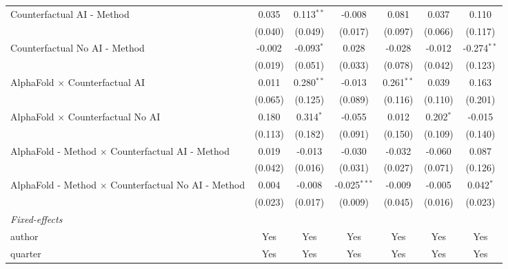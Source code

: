 \begin{tabular}{lcccccc}
   Counterfactual AI - Method                                 & 0.035   & 0.113$^{**}$ & -0.008         & 0.081        & 0.037        & 0.110\\   
                                                              & (0.040) & (0.049)      & (0.017)        & (0.097)      & (0.066)      & (0.117)\\   
   Counterfactual No AI - Method                              & -0.002  & -0.093$^{*}$ & 0.028          & -0.028       & -0.012       & -0.274$^{**}$\\   
                                                              & (0.019) & (0.051)      & (0.033)        & (0.078)      & (0.042)      & (0.123)\\   
   AlphaFold $\times$ Counterfactual AI                       & 0.011   & 0.280$^{**}$ & -0.013         & 0.261$^{**}$ & 0.039        & 0.163\\   
                                                              & (0.065) & (0.125)      & (0.089)        & (0.116)      & (0.110)      & (0.201)\\   
   AlphaFold $\times$ Counterfactual No AI                    & 0.180   & 0.314$^{*}$  & -0.055         & 0.012        & 0.202$^{*}$  & -0.015\\   
                                                              & (0.113) & (0.182)      & (0.091)        & (0.150)      & (0.109)      & (0.140)\\   
   AlphaFold - Method $\times$ Counterfactual AI - Method     & 0.019   & -0.013       & -0.030         & -0.032       & -0.060       & 0.087\\   
                                                              & (0.042) & (0.016)      & (0.031)        & (0.027)      & (0.071)      & (0.126)\\   
   AlphaFold - Method $\times$ Counterfactual No AI - Method  & 0.004   & -0.008       & -0.025$^{***}$ & -0.009       & -0.005       & 0.042$^{*}$\\   
                                                              & (0.023) & (0.017)      & (0.009)        & (0.045)      & (0.016)      & (0.023)\\   
   \midrule
   \emph{Fixed-effects}\\
   author                                                     & Yes     & Yes          & Yes            & Yes          & Yes          & Yes\\  
   quarter                                                    & Yes     & Yes          & Yes            & Yes          & Yes          & Yes\\  

\end{tabular}
